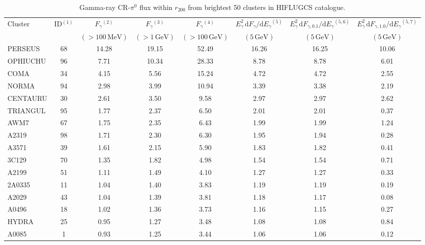 \documentclass[10pt,aps,pra,reprint,amsmath,amsfonts,amssymb,showpacs,nofootinbib,floatfix]{revtex4-1}
\newcommand{\rmn}{\mathrm}
\newcommand{\vstt}{\vspace{-0.0mm}}
\newcommand{\dd}{\rmn{d}}
\newcommand{\rvir}{r_{200}}
\newcommand{\eg}{E_\gamma}
\begin{document}
{\begin{table}
\begin{minipage}{2.0\columnwidth}
  \caption{Gamma-ray CR-$\pi^0$ flux within $\rvir$ from brightest 50 clusters in HIFLUGCS catalogue.}
\begin{tabular}{l c c c c c c c}
\hline
\hline
 Cluster & ID$^{(1)}$ & $F_{\gamma}$$^{(2)}$ & $F_{\gamma}$$^{(3)}$&
 $F_{\gamma}$$^{(4)}$ & $\eg^2\,\dd F_{\gamma}/\dd \eg$$^{(5)}$ &
 $\eg^2\,\dd F_{\gamma,0.1}/\dd \eg$$^{(5,6)}$ &
 $\eg^2\,\dd F_{\gamma,1.0}/\dd \eg$$^{(5,7)}$\\
  & & $(>100\,\rmn{MeV})$ & $(>1\,\rmn{GeV})$ & $(>100\,\rmn{GeV})$ &
 $(5\,\rmn{GeV})$ & $(5\,\rmn{GeV})$ & $(5\,\rmn{GeV})$\\
 \hline
PERSEUS  &  68 &  14.28 &  19.15 &  52.49 &  16.26 &  16.25 &  10.06 \vstt \\
OPHIUCHU &  96 &   7.71 &  10.34 &  28.33 &   8.78 &   8.78 &   6.01 \vstt \\
COMA     &  34 &   4.15 &   5.56 &  15.24 &   4.72 &   4.72 &   2.55 \vstt \\
NORMA    &  94 &   2.98 &   3.99 &  10.94 &   3.39 &   3.38 &   2.19 \vstt \\
CENTAURU &  30 &   2.61 &   3.50 &   9.58 &   2.97 &   2.97 &   2.62 \vstt \\
TRIANGUL &  95 &   1.77 &   2.37 &   6.50 &   2.01 &   2.01 &   0.37 \vstt \\
AWM7     &  67 &   1.75 &   2.35 &   6.43 &   1.99 &   1.99 &   1.24 \vstt \\
A2319    &  98 &   1.71 &   2.30 &   6.30 &   1.95 &   1.94 &   0.28 \vstt \\
A3571    &  39 &   1.61 &   2.15 &   5.90 &   1.83 &   1.82 &   0.41 \vstt \\
3C129    &  70 &   1.35 &   1.82 &   4.98 &   1.54 &   1.54 &   0.71 \vstt \\
A2199    &  51 &   1.11 &   1.49 &   4.10 &   1.27 &   1.27 &   0.33 \vstt \\
2A0335   &  11 &   1.04 &   1.40 &   3.83 &   1.19 &   1.19 &   0.19 \vstt \\
A2029    &  43 &   1.04 &   1.39 &   3.81 &   1.18 &   1.17 &   0.08 \vstt \\
A0496    &  18 &   1.02 &   1.36 &   3.73 &   1.16 &   1.15 &   0.27 \vstt \\
HYDRA    &  25 &   0.95 &   1.27 &   3.48 &   1.08 &   1.08 &   0.84 \vstt \\
A0085    &   1 &   0.93 &   1.25 &   3.44 &   1.06 &   1.06 &   0.12 \vstt \\

\end{tabular}
\end{minipage}
\end{table}}
\end{document}
